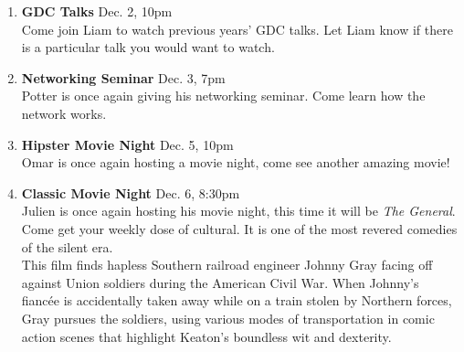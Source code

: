 \documentclass[9pt]{extarticle} %
\begin{document}
\begin{minipage}[t]{.35\linewidth}
\begin{mdframed}[style=sidebar,frametitle={}]
\begin{enumerate}[leftmargin=0.2cm]
\item \textbf{GDC Talks} Dec. 2, 10pm \\
	Come join Liam to watch previous years' GDC talks. Let Liam know
	if there is a particular talk you would want to watch. \\

\item \textbf{Networking Seminar} Dec. 3, 7pm \\
	Potter is once again giving his networking seminar. Come learn how
	the network works. \\
	
\item \textbf{Hipster Movie Night} Dec. 5, 10pm \\
	Omar is once again hosting a movie night, come see another amazing
	movie! \\

\item \textbf{Classic Movie Night} Dec. 6, 8:30pm \\
	Julien is once again hosting his movie night, this time it will
	be \textit{The General}. Come get your weekly dose of cultural. 
	It is one of the most revered comedies of the silent era. \\
	This film finds hapless Southern railroad engineer Johnny Gray
	facing off against Union soldiers during the American Civil War.
	When Johnny's fiancée is accidentally taken away while on a train
	stolen by Northern forces, Gray pursues the soldiers, using various
	modes of transportation in comic action scenes that highlight Keaton's
	boundless wit and dexterity.
\end{enumerate}





\end{mdframed}
\end{minipage}\hfill %
%
%
\end{document}
